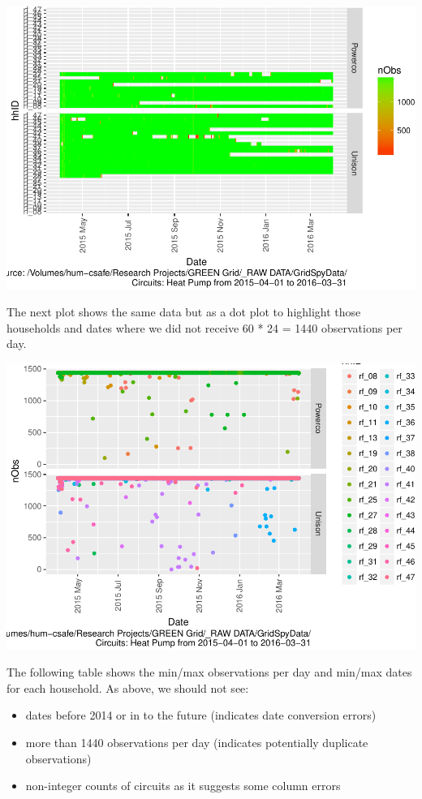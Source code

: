 \documentclass[]{article}
\providecommand{\tightlist}{%
  \setlength{\itemsep}{0pt}\setlength{\parskip}{0pt}}
\begin{document}
\includegraphics{nzGGHouseholdPowerDemandProfile_Heat Pump_2015-04-01_2016-03-31_files/figure-latex/loadedFilesObs Tile Plot-1.pdf}

The next plot shows the same data but as a dot plot to highlight those
households and dates where we did not receive 60 * 24 = 1440
observations per day.

\includegraphics{nzGGHouseholdPowerDemandProfile_Heat Pump_2015-04-01_2016-03-31_files/figure-latex/loadedFilesObs point plot-1.pdf}

The following table shows the min/max observations per day and min/max
dates for each household. As above, we should not see:

\begin{itemize}
\tightlist
\item
  dates before 2014 or in to the future (indicates date conversion
  errors)
\item
  more than 1440 observations per day (indicates potentially duplicate
  observations)
\item
  non-integer counts of circuits as it suggests some column errors
\end{itemize}
\end{document}
